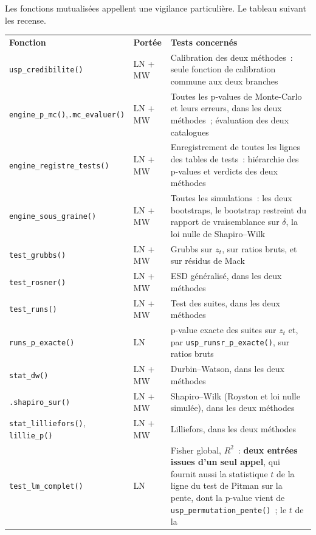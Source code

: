 \documentclass[a4paper,11pt]{article}
\newcommand{\code}[1]{\texttt{\small #1}}
\begin{document}
\medskip
\noindent
Les fonctions mutualisées appellent une vigilance particulière. Le tableau
suivant les recense.

\begin{center}
\small
{}
\begin{tabular}{@{}p{4.4cm}p{1.9cm}p{8.5cm}@{}}
\rowcolor{tableheader}
\textcolor{financeblue}{\textbf{Fonction}} &
\textcolor{financeblue}{\textbf{Portée}} &
\textcolor{financeblue}{\textbf{Tests concernés}} \\
\code{usp\_credibilite()} & LN + MW & Calibration des deux méthodes~: seule
fonction de calibration commune aux deux branches \\
\code{engine\_p\_mc()},\newline \code{.mc\_evaluer()} & LN + MW & Toutes les p-values de
Monte-Carlo et leurs erreurs, dans les deux méthodes~; évaluation des deux catalogues \\
\code{engine\_registre\_}\newline\code{tests()} & LN + MW & Enregistrement de toutes les lignes
des tables de tests~: hiérarchie des p-values et verdicts des deux méthodes \\
\code{engine\_sous\_graine()} & LN + MW & Toutes les simulations~: les deux bootstraps, le
bootstrap restreint du rapport de vraisemblance sur $\delta$, la loi nulle de Shapiro--Wilk \\
\code{test\_grubbs()} & LN + MW & Grubbs sur $z_t$, sur ratios bruts, et sur
résidus de Mack \\
\code{test\_rosner()} & LN + MW & ESD généralisé, dans les deux méthodes \\
\code{test\_runs()} & LN + MW & Test des suites, dans les deux méthodes \\
\code{runs\_p\_exacte()} & LN & p-value exacte des suites sur $z_t$ et, par
\code{usp\_runsr\_p\_exacte()}, sur ratios bruts \\
\code{stat\_dw()} & LN + MW & Durbin--Watson, dans les deux méthodes \\
\code{.shapiro\_sur()} & LN + MW & Shapiro--Wilk (Royston et loi nulle simulée),
dans les deux méthodes \\
\code{stat\_lilliefors()}, \code{lillie\_p()} & LN + MW & Lilliefors, dans les
deux méthodes \\
\code{test\_lm\_complet()} & LN & Fisher global,
$R^2$~: \textbf{deux entrées issues d'un seul appel}, qui fournit aussi la
statistique $t$ de la ligne du test de Pitman sur la pente, dont la p-value
vient de \code{usp\_permutation\_pente()}~; le $t$ de la

\end{tabular}
\end{center}
\end{document}
